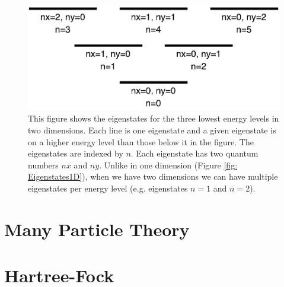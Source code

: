 \documentclass[../main.tex]{subfiles}
\begin{document}
\begin{figure}[!ht]
    \centering
    \includegraphics[scale=0.7]{figures/Eigenstates2D}
    \caption{This figure shows the eigenstates for the three lowest energy levels in two dimensions. Each line is one eigenstate and a given eigenstate is on a higher energy level than those below it in the figure. The eigenstates are indexed by $n$. Each eigenstate has two quantum numbers $nx$ and $ny$. Unlike in one dimension (Figure \ref{fig: Eigenstates1D}), when we have two dimensions we can have multiple eigenstates per energy level (e.g. eigenstates $n=1$ and $n=2$).}
    \label{fig: Eigenstates2D}
\end{figure}

\section{Many Particle Theory}

\section{Hartree-Fock}
\end{document}
